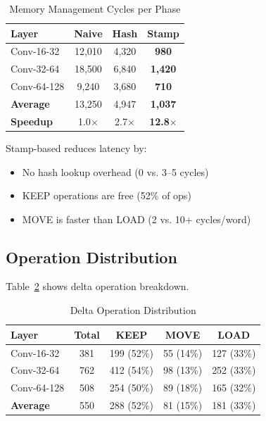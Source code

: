 \documentclass[conference]{IEEEtran}
\begin{document}
\begin{table}[t]
\centering
\caption{Memory Management Cycles per Phase}
\label{tab:latency}
\begin{tabular}{lccc}
\toprule
\textbf{Layer} & \textbf{Naive} & \textbf{Hash} & \textbf{Stamp} \\
\midrule
Conv-16-32 & 12,010 & 4,320 & \textbf{980} \\
Conv-32-64 & 18,500 & 6,840 & \textbf{1,420} \\
Conv-64-128 & 9,240 & 3,680 & \textbf{710} \\
\midrule
\textbf{Average} & 13,250 & 4,947 & \textbf{1,037} \\
\textbf{Speedup} & 1.0$\times$ & 2.7$\times$ & \textbf{12.8$\times$} \\
\bottomrule
\end{tabular}
\end{table}

Stamp-based reduces latency by:
\begin{itemize}
\item No hash lookup overhead (0 vs. 3--5 cycles)
\item KEEP operations are free (52\% of ops)
\item MOVE is faster than LOAD (2 vs. 10+ cycles/word)
\end{itemize}

\subsection{Operation Distribution}

Table~\ref{tab:ops} shows delta operation breakdown.

\begin{table}[t]
\centering
\caption{Delta Operation Distribution}
\label{tab:ops}
\begin{tabular}{lcccc}
\toprule
\textbf{Layer} & \textbf{Total} & \textbf{KEEP} & \textbf{MOVE} & \textbf{LOAD} \\
\midrule
Conv-16-32 & 381 & 199 (52\%) & 55 (14\%) & 127 (33\%) \\
Conv-32-64 & 762 & 412 (54\%) & 98 (13\%) & 252 (33\%) \\
Conv-64-128 & 508 & 254 (50\%) & 89 (18\%) & 165 (32\%) \\
\midrule
\textbf{Average} & 550 & 288 (52\%) & 81 (15\%) & 181 (33\%) \\
\bottomrule
\end{tabular}
\end{table}
\end{document}

